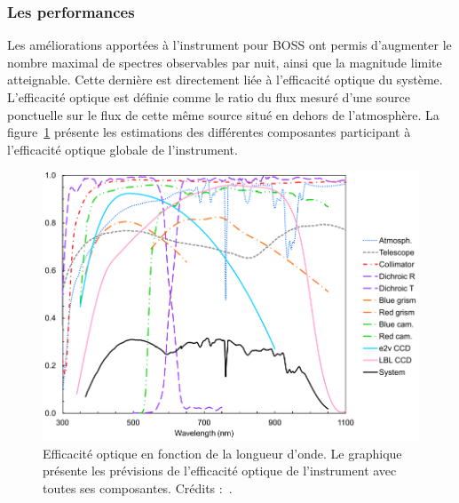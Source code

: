 \subsubsection{Les performances}
Les améliorations apportées à l'instrument pour BOSS ont permis d'augmenter le nombre maximal de spectres observables par nuit, ainsi que la magnitude limite atteignable. Cette dernière est directement liée à l'efficacité optique du système. L'efficacité optique est définie comme le ratio du flux mesuré d'une source ponctuelle sur le flux de cette même source situé en dehors de l'atmosphère. La figure~\ref{fig:SpectroThroughput} présente les estimations des différentes composantes participant à l'efficacité optique globale de l'instrument. %
\begin{figure}
  \centering
  \includegraphics[scale=0.35]{SpectroThroughput}
  \caption{Efficacité optique en fonction de la longueur d'onde. Le graphique présente les prévisions de l'efficacité optique de l'instrument avec toutes ses composantes. Crédits :~\cite{Smee2012}.}
  \label{fig:SpectroThroughput}
\end{figure}

